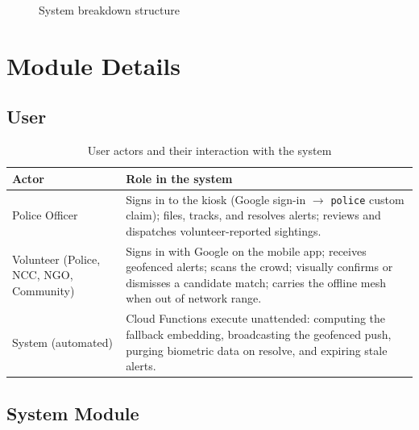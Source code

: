 \documentclass[12pt,a4paper,oneside]{report}
\newcommand{\code}[1]{\texttt{#1}}
\begin{document}
\begin{figure}[H]
{%
}
\caption{System breakdown structure}
\label{fig:sbs}
\end{figure}

\section{Module Details}

\subsection{User}

\begin{table}[H]
\centering
\caption{User actors and their interaction with the system}
\begin{tabular}{|>{\raggedright\arraybackslash}p{3.6cm}|p{10.0cm}|}
\hline
\textbf{Actor} & \textbf{Role in the system} \\
\hline
Police Officer & Signs in to the kiosk (Google sign-in $\rightarrow$ \code{police} custom claim); files, tracks, and resolves alerts; reviews and dispatches volunteer-reported sightings. \\ \hline
Volunteer (Police, NCC, NGO, Community) & Signs in with Google on the mobile app; receives geofenced alerts; scans the crowd; visually confirms or dismisses a candidate match; carries the offline mesh when out of network range. \\ \hline
System (automated) & Cloud Functions execute unattended: computing the fallback embedding, broadcasting the geofenced push, purging biometric data on resolve, and expiring stale alerts. \\
\hline
\end{tabular}
\end{table}

\subsection{System Module}
\end{document}
